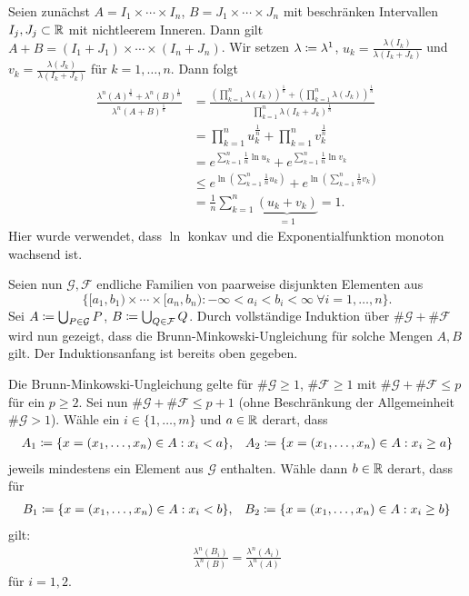 \documentclass[a4paper,twoside,DIV15,BCOR12mm]{scrbook}
\begin{document}
\begin{beweis}
Seien zunächst $A=I_1\times \cdots \times I_n$, $B=J_1\times\cdots\times J_n$ mit beschränken Intervallen $I_j,J_j\subset\mathbb{R}$ mit nichtleerem Inneren. Dann gilt
$A + B = (I_1 + J_1) \times \cdots \times (I_n + J_n)$. Wir setzen $\lambda \da \lambda^1$, $u_k = \frac{\lambda(I_k)}{\lambda(I_k + J_k)}$ und $v_k = \frac{\lambda(J_k)}{\lambda(I_k + J_k)}$ für $k=1,\ldots,n$. Dann folgt
\begin{align*}
\frac{\lambda^n(A)^{\frac1n} + \lambda^n(B)^{\frac1n}}{\lambda^n(A+B)^{\frac1n}}
&= \frac{(\prod_{k=1}^n \lambda(I_k))^{\frac1n} + (\prod_{k=1}^n \lambda(J_k))^{\frac1n}}{\prod_{k=1}^n \lambda(I_k+J_k)^{\frac1n}} \\
&=\prod_{k=1}^n u_k^{\frac1n} + \prod_{k=1}^n v_k^{\frac1n} \\
&= e^{\sum_{k=1}^n \frac1n \ln u_k} + e^{\sum_{k=1}^n \frac1n \ln v_k} \\
&\le e^{\ln(\sum_{k=1}^n \frac1n u_k)} + e^{\ln(\sum_{k=1}^n \frac1n v_k)}\\
&= \frac1n \sum_{k=1}^n \underbrace{(u_k + v_k)}_{=1} = 1.
\end{align*}
Hier wurde verwendet, dass $\ln$ konkav und die Exponentialfunktion monoton wachsend ist. 


Seien nun $\mathcal G, \mathcal F$ endliche Familien von paarweise disjunkten Elementen aus
\[
\{ [a_1,b_1) \times \cdots \times [a_n,b_n) : -\infty < a_i < b_i < \infty \ \forall i=1,\ldots,n\}.
\]
Sei $A \da \bigcup_{P\in\mathcal G}P$, $B\da\bigcup_{Q\in\mathcal F}Q$. Durch vollständige Induktion über $\#\mathcal G + \#\mathcal F$ wird nun gezeigt, dass die Brunn-Minkowski-Ungleichung für solche Mengen $A,B$ gilt. Der Induktionsanfang ist bereits oben gegeben.

Die Brunn-Minkowski-Ungleichung gelte für $\#\mathcal G\ge 1$, $\#\mathcal F\ge 1$ mit $\#\mathcal G + \#\mathcal F \le p$ für ein $p\ge 2$. Sei nun $\#\mathcal G + \#\mathcal F \leq  p+1$ (ohne Beschränkung der Allgemeinheit $\#\mathcal G>1$). Wähle ein $i\in\{1,\ldots,m\}$ und $a\in\mathbb{R}$ derart, dass 
\begin{align*}
A_1 \da \{x = (x_1,\dots,x_n)\in A : x_i < a\}, &&
A_2 \da \{x = (x_1,\dots,x_n)\in A : x_i \ge a\}
\end{align*}
jeweils mindestens ein Element aus $\mathcal G$ enthalten. Wähle dann $b\in\mathbb{R}$ derart, dass für
\begin{align*}
B_1 \da \{x = (x_1,\dots,x_n)\in A : x_i < b\}, && 
B_2 \da \{x = (x_1,\dots,x_n)\in A : x_i \ge b\}
\end{align*}
gilt:
\begin{align*}
\frac{\lambda^n(B_i)}{\lambda^n(B)} = \frac{\lambda^n(A_i)}{\lambda^n(A)}
\end{align*}
für $i=1,2$.


\end{beweis}
\end{document}
